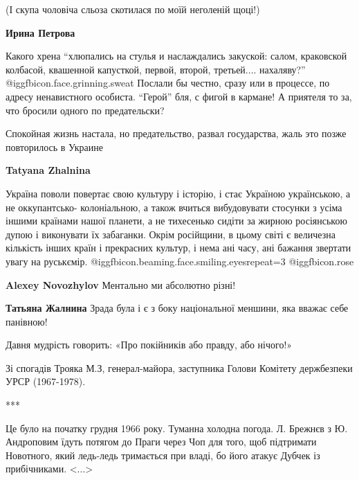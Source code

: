 \begin{itemize}
\begin{itemize}
\begin{itemize}
(І скупа чоловіча сльоза скотилася по моїй неголеній щоці!)

\textbf{Ирина Петрова} 

Какого хрена \enquote{хлюпались на стулья и наслаждались закуской: салом,
краковской колбасой, квашенной капусткой, первой, второй, третьей....
нахаляву?} @igg{fbicon.face.grinning.sweat}  Послали бы честно, сразу или в
процессе, по адресу ненавистного особиста. \enquote{Герой} бля, с фигой в
кармане! А приятеля то за, что бросили одного по предательски?

\end{itemize} %

\end{itemize} %


Спокойная жизнь настала, но предательство, развал государства, жаль это позже
повторилось в Украине

\begin{itemize} %
\textbf{Tatyana Zhalnina} 

Україна поволи повертає свою культуру і історію, і стає Україною українською, а
не оккупантсько- колоніальною, а також вчиться вибудовувати стосунки з усіма
іншими країнами нашої планети, а не тихесенько сидіти за жирною росіянською
дупою і виконувати їх забаганки. Окрім російщини, в цьому світі є величезна
кількість інших країн і прекрасних культур, і нема ані часу, ані бажання
звертати увагу на руськємір.  @igg{fbicon.beaming.face.smiling.eyes}{repeat=3}  @igg{fbicon.rose} 

\textbf{Alexey Novozhylov} Ментально ми абсолютно різні!

\textbf{Татьяна Жалнина} Зрада була і є з боку національної меншини, яка вважає себе панівною!
\end{itemize} %


Давня мудрість говорить: «Про покійників або правду, або нічого!»

Зі спогадів Трояка М.З, генерал-майора, заступника Голови Комітету держбезпеки УРСР (1967-1978).

***

Це було на початку грудня 1966 року. Туманна холодна погода. Л. Брежнєв з Ю.
Андроповим їдуть потягом до Праги через Чоп для того, щоб підтримати Новотного,
який ледь-ледь тримається при владі, бо його атакує Дубчек із прибічниками. <...>


\end{itemize}
